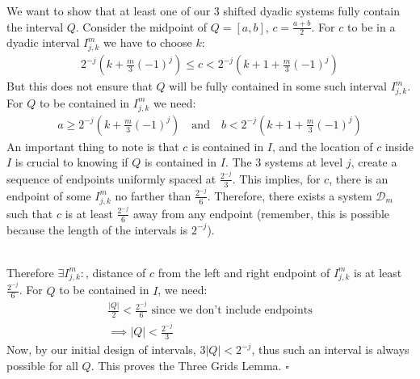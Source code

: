 \documentclass{article}
\newcommand{\D}{\mathcal{D}}
\begin{document}
We want to show that at least one of our 3 shifted dyadic systems fully contain the interval $Q$. Consider the midpoint of $Q = [a,b]$, $c = \frac{a+b}{2}$. For $c$ to be in a dyadic interval $I_{j,k}^m$ we have to choose $k$:
\begin{gather*}
    2^{-j}(k + \frac{m}{3} (-1)^{j}) \leq c < 2^{-j} (k + 1 + \frac{m}{3}(-1)^{j})
\end{gather*}
But this does not ensure that $Q$ will be fully contained in some such interval $I_{j,k}^m$. For $Q$ to be contained in $I_{j,k}^m$ we need:
\begin{gather*}
    a \geq 2^{-j}(k + \frac{m}{3}(-1)^{j}) \quad \text{and} \quad b < 2^{-j}(k + 1 + \frac{m}{3}(-1)^{j})
\end{gather*}
An important thing to note is that $c$ is contained in $I$, and the location of $c$ inside $I$ is crucial to knowing if $Q$ is contained in $I$. The 3 systems at level $j$, create a sequence of endpoints uniformly spaced at $\frac{2^{-j}}{3}$. This implies, for $c$, there is an endpoint of some $I_{j,k}^m$ no farther than $\frac{2^{-j}}{6}$. Therefore, there exists a system $\D_m$ such that $c$ is at least $\frac{2^{-j}}{6}$ away from any endpoint (remember, this is possible because the length of the intervals is $2^{-j}$). 
\\~

Therefore $\exists I_{j,k}^m: $, distance of $c$ from the left and right endpoint of $I_{j,k}^m$ is at least $\frac{2^{-j}}{6}$. For $Q$ to be contained in $I$, we need:
\begin{gather*}
    \frac{|Q|}{2} < \frac{2^{-j}}{6} \text{ since we don't include endpoints}\\
    \implies |Q| < \frac{2^{-j}}{3}
\end{gather*}
Now, by our initial design of intervals, $3|Q| < 2^{-j}$, thus such an interval is always possible for all $Q$. This proves the Three Grids Lemma. $\square$
\\~
\end{document}
